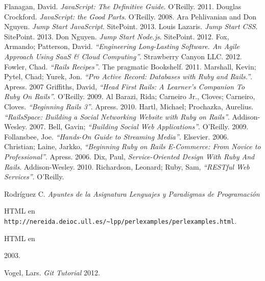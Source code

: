 \documentclass[11pt,a4paper]{article}
\begin{document}
\begin{thebibliography}{99}
 Flanagan, David. \emph{JavaScript: The Definitive Guide}. O'Reilly. 2011.
 Douglas Crockford. \emph{JavaScript: the Good Parts}. O'Reilly. 2008.
 Ara Pehlivanian and Don Nguyen. \emph{Jump Start JavaScript}. SitePoint. 2013.
 Louis Lazaris. \emph{Jump Start CSS}. SitePoint. 2013.
 Don Nguyen. \emph{Jump Start Node.js}. SitePoint. 2012.
 Fox, Armando; Patterson, David. \emph{“Engineering Long-Lasting Software. An Agile Approach Using SaaS \& Cloud Computing”}. Strawberry Canyon LLC. 2012.
 Fowler, Chad. \emph{“Rails Recipes”}. The pragmatic Bookshelf. 2011.
 Marshall, Kevin; Pytel, Chad; Yurek, Jon. \emph{“Pro Active Record: Databases with Ruby and Rails.”}. Apress. 2007
 Griffiths, David, \emph{“Head First Rails: A Learner's Companion To Ruby On Rails”}. O’Reilly. 2009.
 Al Barazi, Rida; Carneiro Jr., Cloves; Carneiro, Cloves. \emph{“Beginning Rails 3”}. Apress. 2010.
 Hartl, Michael; Prochazka, Aurelius. \emph{“RailsSpace: Building a Social Networking Website with Ruby on Rails”}.  Addison-Wesley. 2007.
 Bell, Gavin; \emph{“Building Social Web Applications”}. O’Reilly. 2009.
 Follansbee, Joe. \emph{“Hands-On Guide to Streaming Media”}. Elsevier. 2006.
 Christian; Laine, Jarkko, \emph{“Beginning Ruby on Rails E-Commerce: From Novice to Professional”}. Apress. 2006.
 Dix, Paul, \emph{Service-Oriented Design With Ruby And Rails}. Addison-Wesley. 2010.
 Richardson, Leonard; Ruby, Sam, \emph{“RESTful Web Services”}. O’Reilly. 

 Rodríguez C.  \emph{Apuntes de la Asignatura Lenguajes y Paradigmas de Programación }\\ 
    \begin{latexonly}
    HTML en \verb|http://nereida.deioc.ull.es/~lpp/perlexamples/perlexamples.html|.\\
    \end{latexonly}
    \begin{htmlonly}
    HTML en \\
    \end{htmlonly}
    2003.

 Vogel, Lars.  \emph{Git Tutorial}
    2012.


\end{thebibliography}
\end{document}
